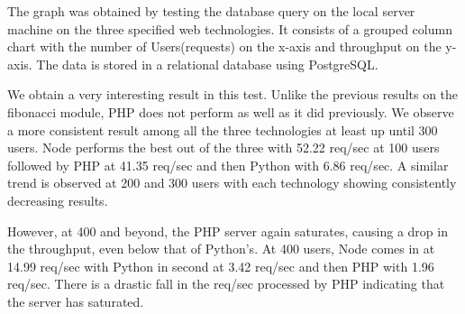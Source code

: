 \documentclass[../thesis.tex]{subfiles}
\begin{document}
\newpage
The graph was obtained by testing the database query on the local server machine on the three specified web technologies. It consists of a grouped column chart with the number of Users(requests) on the x-axis and throughput on the y-axis. The data is stored in a relational database using PostgreSQL.
\newline

We obtain a very interesting result in this test. Unlike the previous results on the fibonacci module, PHP does not perform as well as it did previously. We observe a more consistent result among all the three technologies at least up until 300 users. Node performs the best out of the three with 52.22 req/sec at 100 users followed by PHP at 41.35 req/sec and then Python with 6.86 req/sec. A similar trend is observed at 200 and 300 users with each technology showing consistently decreasing results.
\newline

However, at 400 and beyond, the PHP server again saturates, causing a drop in the throughput, even below that of Python's. At 400 users, Node comes in at 14.99 req/sec with Python in second at 3.42 req/sec and then PHP with 1.96 req/sec. There is a drastic fall in the req/sec processed by PHP indicating that the server has saturated.
\newline
\end{document}
